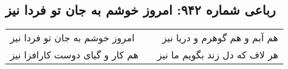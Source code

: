 \begin{center}
\section*{رباعی شماره ۹۴۲: امروز خوشم به جان تو فردا نیز}
\label{sec:0942}
\begin{longtable}{l p{0.5cm} r}
امروز خوشم به جان تو فردا نیز
&&
هم آبم و هم گوهرم و دریا نیز
\\
هم کار و گیای دوست کارافزا نیز
&&
هر لاف که دل زند بگویم ما نیز
\\
\end{longtable}
\end{center}
